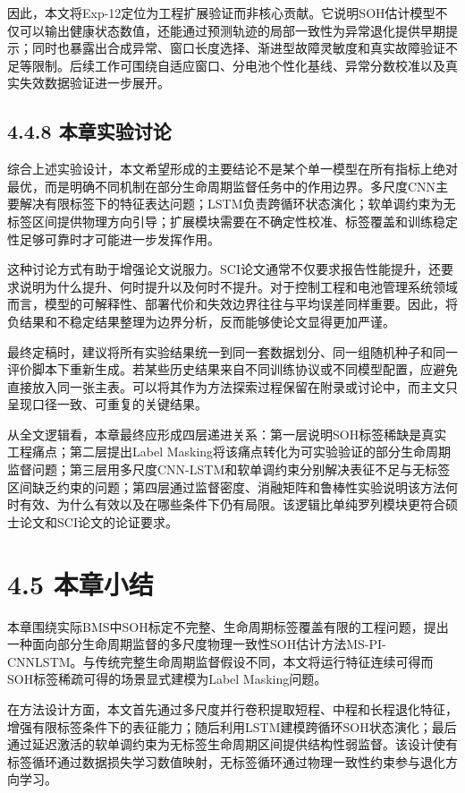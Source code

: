\documentclass[12pt, a4paper]{ctexart}
\begin{document}
因此，本文将Exp-12定位为工程扩展验证而非核心贡献。它说明SOH估计模型不仅可以输出健康状态数值，还能通过预测轨迹的局部一致性为异常退化提供早期提示；同时也暴露出合成异常、窗口长度选择、渐进型故障灵敏度和真实故障验证不足等限制。后续工作可围绕自适应窗口、分电池个性化基线、异常分数校准以及真实失效数据验证进一步展开。



\subsection{4.4.8 本章实验讨论}

综合上述实验设计，本文希望形成的主要结论不是某个单一模型在所有指标上绝对最优，而是明确不同机制在部分生命周期监督任务中的作用边界。多尺度CNN主要解决有限标签下的特征表达问题；LSTM负责跨循环状态演化；软单调约束为无标签区间提供物理方向引导；扩展模块需要在不确定性校准、标签覆盖和训练稳定性足够可靠时才可能进一步发挥作用。


这种讨论方式有助于增强论文说服力。SCI论文通常不仅要求报告性能提升，还要求说明为什么提升、何时提升以及何时不提升。对于控制工程和电池管理系统领域而言，模型的可解释性、部署代价和失效边界往往与平均误差同样重要。因此，将负结果和不稳定结果整理为边界分析，反而能够使论文显得更加严谨。


最终定稿时，建议将所有实验结果统一到同一套数据划分、同一组随机种子和同一评价脚本下重新生成。若某些历史结果来自不同训练协议或不同模型配置，应避免直接放入同一张主表。可以将其作为方法探索过程保留在附录或讨论中，而主文只呈现口径一致、可重复的关键结果。


从全文逻辑看，本章最终应形成四层递进关系：第一层说明SOH标签稀缺是真实工程痛点；第二层提出Label Masking将该痛点转化为可实验验证的部分生命周期监督问题；第三层用多尺度CNN-LSTM和软单调约束分别解决表征不足与无标签区间缺乏约束的问题；第四层通过监督密度、消融矩阵和鲁棒性实验说明该方法何时有效、为什么有效以及在哪些条件下仍有局限。该逻辑比单纯罗列模块更符合硕士论文和SCI论文的论证要求。



\section{4.5 本章小结}

本章围绕实际BMS中SOH标定不完整、生命周期标签覆盖有限的工程问题，提出一种面向部分生命周期监督的多尺度物理一致性SOH估计方法MS-PI-CNNLSTM。与传统完整生命周期监督假设不同，本文将运行特征连续可得而SOH标签稀疏可得的场景显式建模为Label Masking问题。


在方法设计方面，本文首先通过多尺度并行卷积提取短程、中程和长程退化特征，增强有限标签条件下的表征能力；随后利用LSTM建模跨循环SOH状态演化；最后通过延迟激活的软单调约束为无标签生命周期区间提供结构性弱监督。该设计使有标签循环通过数据损失学习数值映射，无标签循环通过物理一致性约束参与退化方向学习。
\end{document}
